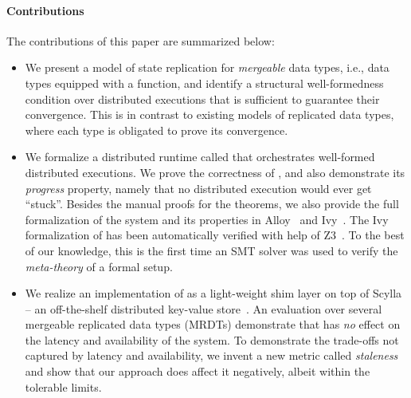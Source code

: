 \paragraph{Contributions} The contributions of this paper are summarized
below:
\begin{itemize}
  \item We present a model of state replication for \emph{mergeable} data
  types, i.e., data types equipped with a  function, and identify a
  structural well-formedness condition over distributed executions that is
  sufficient to guarantee their convergence. This is in contrast to
  existing models of replicated data types, where each type is obligated to
  prove its convergence.

  \item We formalize a distributed runtime called \quark that orchestrates
  well-formed distributed executions. We prove the correctness of \quark,
  and also demonstrate its \emph{progress} property, namely that no
  distributed execution would ever get ``stuck''. Besides the manual proofs
  for the theorems, we also provide the full formalization of the \quark
  system and its properties in Alloy~\cite{alloy} and Ivy~\cite{ivy}. The
  Ivy formalization of \quark has been automatically verified with help of
  Z3~\cite{z3}. To the best of our knowledge, this is the first time an SMT
  solver was used to verify the \emph{meta-theory} of a formal setup.

  \item We realize an implementation of \quark as a light-weight shim layer
  on top of Scylla -- an off-the-shelf distributed key-value
  store~\cite{scylla}. An evaluation over several mergeable replicated data
  types (MRDTs) demonstrate that \quark has \emph{no} effect on the latency
  and availability of the system. To demonstrate the trade-offs not
  captured by latency and availability, we invent a new metric called
  \emph{staleness} and show that our approach does affect it negatively, albeit
  within the tolerable limits.
\end{itemize}

